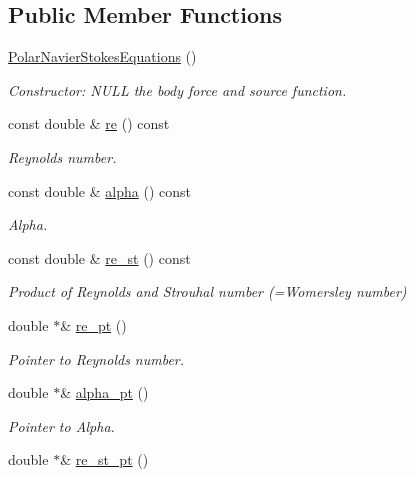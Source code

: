 \subsection*{Public Member Functions}
\begin{DoxyCompactItemize}
\item 
\hyperlink{classoomph_1_1PolarNavierStokesEquations_a01afefd52f1b684325bcb13e26e6445c}{Polar\+Navier\+Stokes\+Equations} ()
\begin{DoxyCompactList}\small\item\em Constructor\+: N\+U\+LL the body force and source function. \end{DoxyCompactList}\item 
const double \& \hyperlink{classoomph_1_1PolarNavierStokesEquations_ac0de4c87dc0440dad909f044a5a99080}{re} () const
\begin{DoxyCompactList}\small\item\em Reynolds number. \end{DoxyCompactList}\item 
const double \& \hyperlink{classoomph_1_1PolarNavierStokesEquations_a4bde38e6f8a429c4e3da7c3ce273045e}{alpha} () const
\begin{DoxyCompactList}\small\item\em Alpha. \end{DoxyCompactList}\item 
const double \& \hyperlink{classoomph_1_1PolarNavierStokesEquations_ac539e938a5a877e708e2af0d84ca4edb}{re\+\_\+st} () const
\begin{DoxyCompactList}\small\item\em Product of Reynolds and Strouhal number (=Womersley number) \end{DoxyCompactList}\item 
double $\ast$\& \hyperlink{classoomph_1_1PolarNavierStokesEquations_a610a64f63c464c0bbf1a0bcf18cf2856}{re\+\_\+pt} ()
\begin{DoxyCompactList}\small\item\em Pointer to Reynolds number. \end{DoxyCompactList}\item 
double $\ast$\& \hyperlink{classoomph_1_1PolarNavierStokesEquations_acb011e76496a8c8dac3b980ab7025c3e}{alpha\+\_\+pt} ()
\begin{DoxyCompactList}\small\item\em Pointer to Alpha. \end{DoxyCompactList}\item 
double $\ast$\& \hyperlink{classoomph_1_1PolarNavierStokesEquations_ad65b2a598827ace886f48f9c5b278ed6}{re\+\_\+st\+\_\+pt} ()

\end{DoxyCompactItemize}
